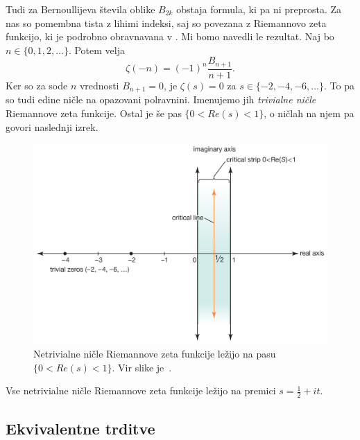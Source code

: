 \documentclass[mat1]{fmfdelo}
\begin{document}
Tudi za Bernoullijeva števila oblike $B_{2k}$ obstaja formula, ki pa ni preprosta.
Za nas so pomembna tista z lihimi indeksi, saj so povezana z Riemannovo zeta funkcijo, ki je podrobno obravnavana v \cite[poglavje 1.5]{zetafunction}. Mi bomo navedli le rezultat. Naj bo $n\in\{0, 1, 2, \dots\}$. Potem velja
\begin{equation}
	\zeta(-n) = (-1)^n \frac{B_{n+1}}{n+1}.
\end{equation}
Ker so za sode $n$ vrednosti $B_{n+1}=0$, je $\zeta(s)=0$ za $s\in\{-2,-4,-6, \dots\}$. To pa so tudi edine ničle na opazovani polravnini. Imenujemo jih \emph{trivialne ničle} Riemannove zeta funkcije. Ostal je še pas $\{0<Re(s)<1\}$, o ničlah na njem pa govori naslednji izrek. 

\begin{figure}[h!]
\begin{center}
\includegraphics[scale=0.3]{zeta_funkcija.png}
\caption{Netrivialne ničle Riemannove zeta funkcije ležijo na pasu $\{0<Re(s)<1\}$. Vir slike je~\cite{britannica}.}
\end{center}
\end{figure}

\begin{izrek}
Vse netrivialne ničle Riemannove zeta funkcije ležijo na premici $s=\frac{1}{2}+it$.
\end{izrek}

\subsection{Ekvivalentne trditve}
\end{document}
